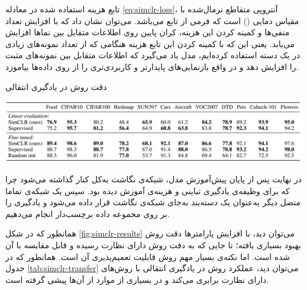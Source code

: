 تابع هزینه استفاده شده در معادله \ref{eq:simclr-loss}،
آنتروپی متقاطع نرمال‌شده با مقیاس دمایی
() است که فرمی از تابع 
می‌باشد. می‌توان نشان داد که با افزایش تعداد منفی‌ها و کمینه کردن این هزینه، کران پایین روی
اطلاعات متقابل
بین نماها افزایش می‌یابد. یعنی این که با کمینه کردن این تابع هزینه هنگامی که از تعداد نمونه‌های زیادی در یک دسته استفاده کرده‌ایم، مدل یاد می‌گیرد که اطلاعات متقابل بین نمونه‌های مثبت را افزایش دهد و در واقع بازنمایی‌های پایدارتر و کاربردی‌تری را از روی داده‌ها بیاموزد.
\begin{table}[t]
\centering
\caption{دقت روش  در یادگیری انتقالی}
\includegraphics[width=1\textwidth]{Images/Chapter2/simclr-transfer.png}
\label{tab:simclr-transfer}
\end{table}
در نهایت پس از پایان پیش‌آموزش مدل، شبکه‌ی نگاشت به‌کل کنار گذاشته می‌شود چرا که برای وظیفه‌ی یادگیری تباینی و هزینه‌ی 
آموزش دیده بود. سپس یک شبکه‌ی تماما متصل دیگر به‌عنوان یک دسته‌بند به‌جای شبکه‌ی نگاشت قرار داده می‌شود و یادگیری را بر روی مجموعه داده برچسب‌دار انجام می‌دهیم.

همانطور که در شکل \ref{fig:simclr-results}
می‌توان دید، با افزایش پارامترها دقت روش 
بهبود بسیاری یافته؛ تا جایی که به دقت روش دارای نظارت رسیده و قابل مقایسه با آن شده است. اما نکته‌ی بسیار مهم روش 
قابلیت تعمیم‌پذیری آن است. همانطور که در جدول \ref{tab:simclr-transfer}
می‌توان دید، عملکرد روش 
در یادگیری انتقالی با روش‌های دارای نظارت برابری می‌کند و در بسیاری از موارد از آن‌ها پیشی گرفته است.

